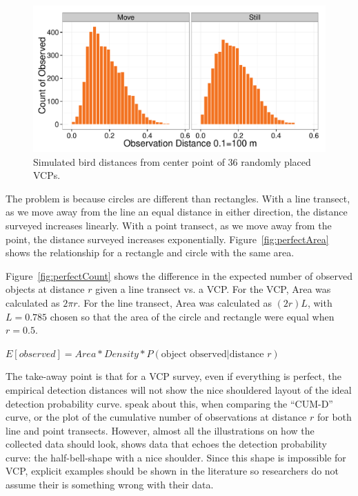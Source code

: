 \documentclass[12pt]{article}
\begin{document}
\begin{figure}[h]
	\center
	\includegraphics[width=\textwidth]{../images/movementTest.pdf}
	\caption{Simulated bird distances from center point of 36 randomly placed VCPs.\label{fig:moveTest}}
\end{figure}

The problem is because circles are different than rectangles. With a line transect, as we move away from the line an equal distance in either direction, the distance surveyed increases linearly. With a point transect, as we move away from the point, the distance surveyed increases exponentially. Figure~\ref{fig:perfectArea} shows the relationship for a rectangle and circle with the same area. 

Figure~\ref{fig:perfectCount} shows the difference in the expected number of observed objects at distance $r$ given a line transect vs. a VCP. For the VCP, Area was calculated as $2\pi r$. For the line transect, Area was calculated as $(2r)L$, with $L=0.785$ chosen so that the area of the circle and rectangle were equal when $r=0.5$.

$E[observed] = Area*Density*P(\mbox{object observed}|\mbox{distance }r)$

The take-away point is that for a VCP survey, even if everything is perfect, the empirical detection distances will not show the nice shouldered layout of the ideal detection probability curve. \textcite{ramsey1981} speak about this, when comparing the ``CUM-D'' curve, or the plot of the cumulative number of observations at distance $r$ for both line and point transects. However, almost all the illustrations on how the collected data should look, shows data that echoes the detection probability curve: the half-bell-shape with a nice shoulder. Since this shape is impossible for VCP, explicit examples should be shown in the literature so researchers do not assume their is something wrong with their data.
\end{document}
